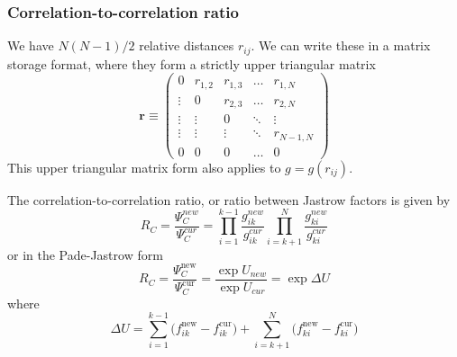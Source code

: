\documentclass[11pt]{article}
\begin{document}
	\subsubsection{Correlation-to-correlation ratio}

		We have $N\left(N-1\right)/2$ relative distances $r_{ij}$. We can
		write these in a matrix storage format, where they form a strictly
		upper triangular matrix
		\[
		\mathbf{r}\equiv\left(\begin{array}{ccccc}
		0 & r_{1,2} & r_{1,3} & \dots & r_{1,N}\\
		\vdots & 0 & r_{2,3} & \dots & r_{2,N}\\
		\vdots & \vdots & 0 & \ddots & \vdots\\
		\vdots & \vdots & \vdots & \ddots & r_{N-1,N}\\
		0 & 0 & 0 & \dots & 0
		\end{array}\right)
		\]
		This upper triangular matrix form also applies to $g=g\left(r_{ij}\right)$.

		The correlation-to-correlation ratio, or ratio between Jastrow factors
		is given by
		\[
		R_{C}=\frac{\Psi_{C}^{new}}{\Psi_{C}^{cur}}=\prod_{i=1}^{k-1}\frac{g_{ik}^{new}}{g_{ik}^{cur}}\prod_{i=k+1}^{N}\frac{g_{ki}^{new}}{g_{ki}^{cur}}
		\]
		or in the Pade-Jastrow form
		\[
		R_{C}=\frac{\Psi_{C}^{\mathrm{new}}}{\Psi_{C}^{\mathrm{cur}}}=\frac{\exp U_{new}}{\exp U_{cur}}=\exp \Delta U
		\]
		where 
		\[
		\Delta U =
		\sum_{i=1}^{k-1}\big(f_{ik}^\mathrm{new}-f_{ik}^\mathrm{cur}\big)
		+
		\sum_{i=k+1}^{N}\big(f_{ki}^\mathrm{new}-f_{ki}^\mathrm{cur}\big)
		\]
\end{document}
